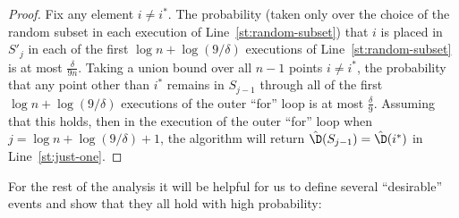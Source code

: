 \begin{proof}
Fix any element $i \neq i^\ast$.  The probability (taken only
over the choice of the random subset in each execution of
Line~\ref{st:random-subset}) that $i$ is placed in $S'_j$ in each of
the first $\log n + \log(9/\delta)$ executions of Line~\ref{st:random-subset}
is at most
${\frac \delta {9n}}.$  Taking a union bound over all $n-1$ points
$i \neq i^\ast$, the probability that any point other than $i^\ast$
remains in $S_{j-1}$ through all of the first $ \log n + \log(9/\delta)$
executions of the outer ``for'' loop is at most
$\frac{\delta}{9}.$  Assuming that this holds, then in the execution of the
outer ``for'' loop when $j=\log n + \log(9/\delta) + 1$, the algorithm
will return $\hat{\D}(S_{j-1}) = \hat{\D}(i^\ast)$ in Line~\ref{st:just-one}.
\end{proof}

For the rest of the analysis
it will be helpful for us to define several ``desirable'' events
and show that they all hold with high probability:

